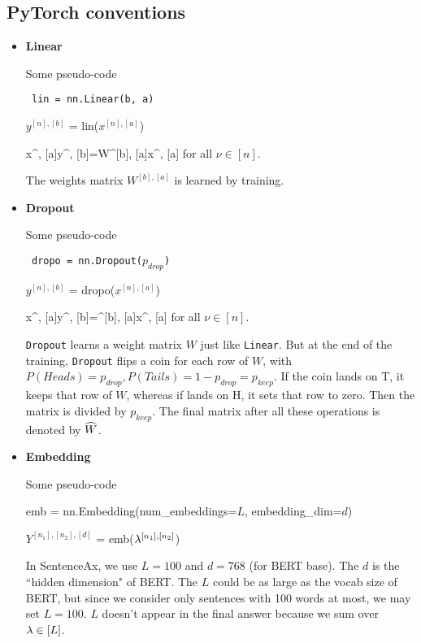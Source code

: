 \subsection{PyTorch conventions}



\begin{itemize}
\item {\bf Linear}

Some pseudo-code
\begin{mdframed}[hidealllines=true,backgroundcolor=blue!10]
{\tt
lin = nn.Linear(b, a)

$y^{[n], [b]}$ = lin($x^{[n],[a]}$)
}
\end{mdframed}

\beq
x^{\nu, [a]}\rarrow y^{\nu, [b]}=W^{[b], [a]}x^{\nu, [a]}
\eeq
for all  $\nu\in[n]$.

The weights matrix $W^{[b], [a]}$ is learned by training.

\item {\bf Dropout}

Some pseudo-code
\begin{mdframed}[hidealllines=true,backgroundcolor=blue!10]
{\tt
dropo = nn.Dropout($p_{drop}$)

$y^{[n], [b]}$ = dropo($x^{[n],[a]}$)
}
\end{mdframed}


\beq
x^{\nu, [a]}\rarrow y^{\nu, [b]}=^{[b], [a]}x^{\nu, [a]}
\eeq
for all  $\nu\in[n]$.

{\tt Dropout} learns a weight matrix $W$ just like
{\tt Linear}. But at the end of the
training,
{\tt  Dropout} flips a coin
for each row of $W$, with $P(Heads)=p_{drop}, P(Tails)=1-p_{drop}=p_{keep}$. If the coin lands on T, it keeps that row of $W$, whereas if lands on H,
it sets that row to zero. Then the
matrix  is
divided by $p_{keep}$.
The final matrix after all these operations  is denoted by ${\widehat{W}}$.



\item {\bf Embedding}

Some pseudo-code
\begin{mdframed}[hidealllines=true,backgroundcolor=blue!10]
{\tt

emb = nn.Embedding(num\_embeddings=$L$, embedding\_dim=$d$)

$Y^{[n_1], [n_2], [d]}$ =
emb($\lambda^{[n_1], [n_2]}$)
}
\end{mdframed}

In SentenceAx, we use $L=100$ and $d=768$ (for BERT base).
The $d$ is the ``hidden dimension" of BERT.
The $L$ could be as large as the vocab size
of BERT, but since we consider only
sentences with 100 words at most,
we may set $L=100$. $L$
doesn't appear in the final answer
because we sum over $\lambda\in[L]$.


\end{itemize}
